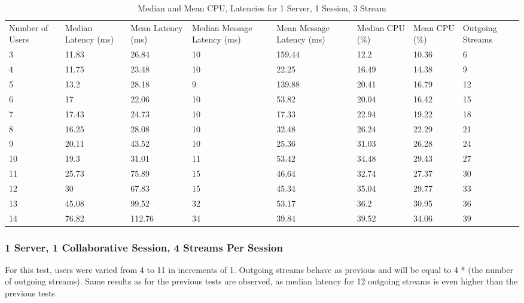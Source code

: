 \begin{table}
\caption{Median and Mean CPU, Latencies for 1 Server, 1 Session, 3 Stream}
\label{table:1serv_1sess_3str}
\begin{tabu} to\linewidth{|X[c]|X[c]|X[c]|X[c]|X[c]|X[c]|X[c]|X[c]|}
\everyrow{\hline}
\hline
Number of Users & Median Latency (ms) & Mean Latency (ms) & Median Message Latency (ms) & Mean Message Latency (ms) & Median CPU (\%) & Mean CPU (\%) & Outgoing Streams\\
3 & 11.83 & 26.84 & 10 & 159.44 & 12.2 & 10.36 & 6 \\
4 & 11.75 & 23.48 & 10 & 22.25 & 16.49 & 14.38 & 9 \\
5 & 13.2 & 28.18 & 9 & 139.88 & 20.41 & 16.79 & 12 \\
6 & 17 & 22.06 & 10 & 53.82 & 20.04 & 16.42 & 15 \\
7 & 17.43 & 24.73 & 10 & 17.33 & 22.94 & 19.22 & 18 \\
8 & 16.25 & 28.08 & 10 & 32.48 & 26.24 & 22.29 & 21 \\
9 & 20.11 & 43.52 & 10 & 25.36 & 31.03 & 26.28 & 24 \\
10 & 19.3 & 31.01 & 11 & 53.42 & 34.48 & 29.43 & 27 \\
11 & 25.73 & 75.89 & 15 & 46.64 & 32.74 & 27.37 & 30 \\
12 & 30 & 67.83 & 15 & 45.34 & 35.04 & 29.77 & 33 \\
13 & 45.08 & 99.52 & 32 & 53.17 & 36.2 & 30.95 & 36 \\
14 & 76.82 & 112.76 & 34 & 39.84 & 39.52 & 34.06 & 39 \\
\end{tabu}
\end{table}

\subsubsection{1 Server, 1 Collaborative Session, 4 Streams Per Session}
\label{sec:1serv_1sess_4str180}

For this test, users were varied from 4 to 11 in increments of 1. Outgoing streams behave as previous and will be equal to 4 * (the number of outgoing streams). Same results as for the previous tests are observed, as median latency for 12 outgoing streams is even higher than the previous tests.

